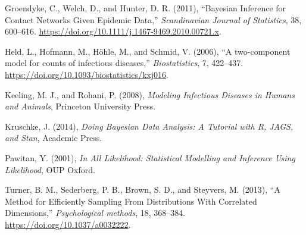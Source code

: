 \documentclass[11pt,a4paper]{article}
\numberwithin{equation}{section}
\begin{document}
\leavevmode\hypertarget{ref-groendyke_bayesian_2011}{}%
Groendyke, C., Welch, D., and Hunter, D. R. (2011), ``Bayesian Inference
for Contact Networks Given Epidemic Data,'' \emph{Scandinavian Journal
of Statistics}, 38, 600--616.
\url{https://doi.org/10.1111/j.1467-9469.2010.00721.x}.

\leavevmode\hypertarget{ref-held_two-component_2006}{}%
Held, L., Hofmann, M., Höhle, M., and Schmid, V. (2006), ``A
two-component model for counts of infectious diseases,''
\emph{Biostatistics}, 7, 422--437.
\url{https://doi.org/10.1093/biostatistics/kxj016}.

\leavevmode\hypertarget{ref-keeling_modeling_2008}{}%
Keeling, M. J., and Rohani, P. (2008), \emph{Modeling Infectious
Diseases in Humans and Animals}, Princeton University Press.

\leavevmode\hypertarget{ref-kruschke_doing_2014}{}%
Kruschke, J. (2014), \emph{Doing Bayesian Data Analysis: A Tutorial with
R, JAGS, and Stan}, Academic Press.

\leavevmode\hypertarget{ref-pawitan_all_2001}{}%
Pawitan, Y. (2001), \emph{In All Likelihood: Statistical Modelling and
Inference Using Likelihood}, OUP Oxford.

\leavevmode\hypertarget{ref-turner_method_2013}{}%
Turner, B. M., Sederberg, P. B., Brown, S. D., and Steyvers, M. (2013),
``A Method for Efficiently Sampling From Distributions With Correlated
Dimensions,'' \emph{Psychological methods}, 18, 368--384.
\url{https://doi.org/10.1037/a0032222}.
\end{document}

